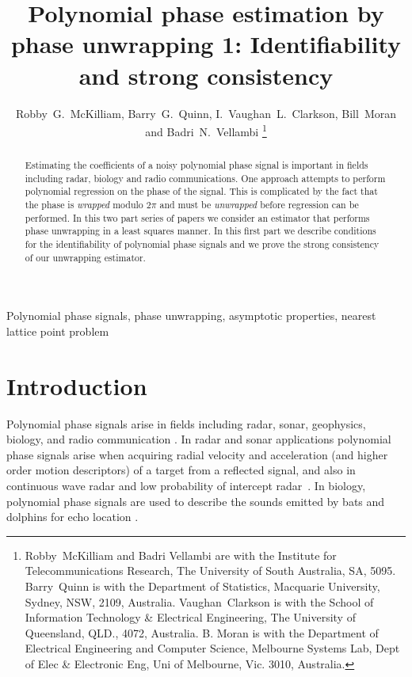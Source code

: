 \documentclass[journal]{IEEEtran}
\title{Polynomial phase estimation by phase unwrapping 1: Identifiability and strong consistency}
\author{Robby~G.~McKilliam, Barry~G.~Quinn, I.~Vaughan~L.~Clarkson, Bill~Moran and Badri~N.~Vellambi%
    \thanks{%
Robby~McKilliam and Badri Vellambi are with the Institute for Telecommunications Research, The University of South Australia, SA, 5095.  Barry~Quinn is with the Department of Statistics, Macquarie University, Sydney, NSW, 2109, Australia.   Vaughan~Clarkson is with the School of Information Technology \& Electrical Engineering, The University of Queensland, QLD., 4072, Australia.  B. Moran is with the Department of Electrical Engineering and Computer
Science, Melbourne Systems Lab, Dept of Elec \& Electronic Eng, Uni of Melbourne, Vic. 3010, Australia.}}
\begin{document}
 
\maketitle

\begin{abstract}
Estimating the coefficients of a noisy polynomial phase signal is important in fields including radar, biology and radio communications. One approach attempts to perform polynomial regression on the phase of the signal.  This is complicated by the fact that the phase is \emph{wrapped} modulo $2\pi$ and must be \emph{unwrapped} before regression can be performed. %
In this two part series of papers we consider an estimator that performs phase unwrapping in a least squares manner.  In this first part we describe conditions for the identifiability of polynomial phase signals and we prove the strong consistency of our unwrapping estimator.
\end{abstract}

\begin{keywords}
Polynomial phase signals, phase unwrapping, asymptotic properties, nearest lattice point problem
\end{keywords}
 
%

\section{Introduction} \label{intro}

Polynomial phase signals arise in fields including radar, sonar, geophysics, biology, and radio communication \cite{Angeby_estimating_2000}. In radar and sonar applications polynomial phase signals arise when acquiring radial velocity and acceleration (and higher order motion descriptors) of a target from a reflected signal, and also in continuous wave radar and low probability of intercept radar~\cite{Levanon_Radar_signals_2004}.  In biology, polynomial phase signals are used to describe the sounds emitted by bats and dolphins for echo location \citep{Suga_1975_bats_echolocation, Moss_2005echolocation}.  
\end{document}
